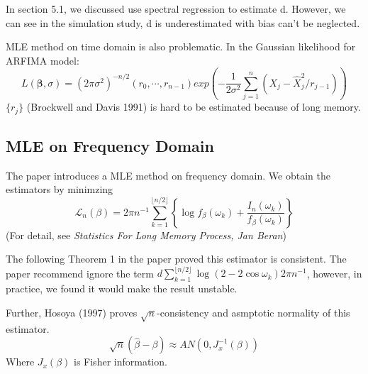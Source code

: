 \documentclass[10pt,a4paper]{article}
\begin{document}
In section 5.1, we discussed use spectral regression to estimate d. However, we can see in the simulation study, d is underestimated with bias can't be neglected.

MLE method on time domain is also problematic. In the Gaussian likelihood for ARFIMA model:\[
L(\bm{\beta},\sigma)=(2\pi\sigma^2)^{-n/2}(r_0,\cdots,r_{n-1})exp(-\frac{1}{2\sigma^2}\sum_{j=1}^{n}(X_j-\hat{X}_j^2/r_{j-1}))
\] 
$\{r_j\}$ (Brockwell and Davis 1991\cite{series1997springer}) is hard to be estimated because of long memory.
\subsection{MLE on Frequency Domain}
The paper introduces a MLE method on frequency domain. We obtain the estimators by minimzing $$\mathcal{L}_n(\beta)=2\pi n^{-1} \sum_{k=1}^{\lfloor n/2\rfloor} \left\{ \log f_\beta (\omega_k)+\frac{I_n(\omega_k)}{f_\beta (\omega_k)}\right\} $$
(For detail, see \emph{Statistics For Long Memory Process, Jan Beran})

The following Theorem 1 in the paper proved this estimator is consistent. The paper recommend ignore the term $d\sum_{k=1}^{\lfloor n/2\rfloor}\log(2-2\cos\omega_k)2\pi n^{-1}$, however, in practice, we found it would make the result unstable.

Further, Hosoya (1997)\cite{hosoya1997limit} proves $\sqrt{n}$-consistency and asmptotic normality of this estimator. \[
\sqrt{n}(\hat{\beta}-\beta)\approx AN(0,J_x^{-1}(\beta))
\]
Where $J_x(\beta)$ is Fisher information.
\end{document}
